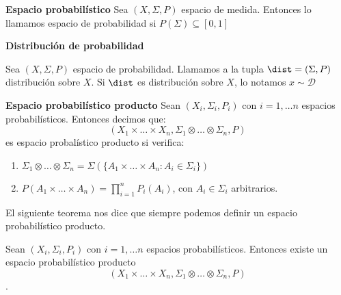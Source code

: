 \begin{definition} \textbf{Espacio probabilístico}
 Sea $(X, \Sigma, P)$ espacio de medida. Entonces lo llamamos espacio de probabilidad si $P(\Sigma)\subseteq [0,1]$
\end{definition}


\begin{definition} \textbf{Distribución de probabilidad}

 Sea $(X, \Sigma, P)$ espacio de probabilidad. Llamamos a la tupla $\dist = (\Sigma,P)$ distribución sobre $X$. 
 Si $\dist$ es distribución sobre $X$, lo notamos $x\sim \mathcal{D}$
\end{definition}

\begin{definition} \textbf{Espacio probabilístico producto}
 Sean $(X_i, \Sigma_i, P_i)$ con $i=1,\ldots n$ espacios probabilísticos. Entonces decimos que:
 \[(X_1 \times \ldots \times X_n, \Sigma_1 \otimes \ldots \otimes \Sigma_n, P)\] es
 espacio probalístico producto si verifica:
 
 \begin{enumerate}[i]
  \item $\Sigma_1 \otimes \ldots \otimes \Sigma_n = \Sigma\left(\{A_1 \times \ldots \times A_n: A_i\in \Sigma_i\}\right)$
  \item $P(A_1 \times \ldots \times A_n) = \prod_{i=1}^n P_i(A_i)$, con $A_i\in \Sigma_i$ arbitrarios.
 \end{enumerate}
\end{definition}

El siguiente teorema nos dice que siempre podemos definir un espacio probabilístico producto.

\begin{theorem}
 Sean $(X_i, \Sigma_i, P_i)$ con $i=1,\ldots n$ espacios probabilísticos. Entonces existe un espacio probabilístico
 producto \[(X_1 \times \ldots \times X_n, \Sigma_1 \otimes \ldots \otimes \Sigma_n, P)\].
\end{theorem}

